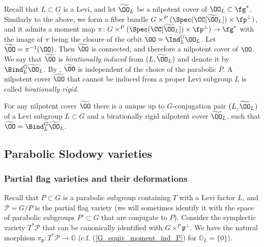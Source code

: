 \documentclass[12pt]{amsart}
\begin{document}
    Recall that $L\subset G$ is a Levi, and let $\widetilde{\OO}_L$ be a nilpotent cover of $\OO_L\subset \fg^*$. Similarly to the above, we form a fiber bundle $G\times^P(\Spec(\CC[\widetilde{\OO}_L])\times \fp^\perp)$, and it admits a moment map $\pi\colon G\times^P(\Spec(\CC[\widetilde{\OO}_L])\times \fp^\perp)\to \fg^*$ with the image of $\pi$ being the closure of the orbit $\OO=\Ind_L^G \OO_L$. Let $\widetilde{\OO}=\pi^{-1}(\OO)$. Then $\widetilde{\OO}$ is connected, and therefore a nilpotent cover of $\OO$. We say that $\widetilde{\OO}$ is \emph{birationally induced} from $(L, \widetilde{\OO}_L)$ and denote it by $\Bind_L^G \widetilde{\OO}_L$. By \cite[Proposition 2.4.1(i)]{LMBM}, $\widetilde{\OO}$ is independent of the choice of the parabolic $P$. A nilpotent cover $\widetilde{\OO}$ that cannot be induced from a proper Levi subgroup $L$ is called \emph{birationally rigid}. 
    \begin{prop}\label{bir ind to bir rigid}\cite[Proposition 2.4.1(iii)]{LMBM}
        For any nilpotent cover $\widetilde{\OO}$ there is a unique up to $G$-conjugation pair $(L,\widetilde{\OO}_L)$ of a Levi subgroup $L\subset G$ and a birationally rigid nilpotent cover $\widetilde{\OO}_L$, such that $\widetilde{\OO}=\Bind_L^G \widetilde{\OO}_L$.
    \end{prop}




    
     
     
    \subsection{Parabolic Slodowy varieties}\label{sec_parabolic_slodowy}
        \subsubsection{Partial flag varieties and their deformations}
    Recall that $P \subset G$ is a parabolic subgroup containing $T$ with a Levi factor $L$, and $\mathcal{P}=G/P$ is the partial flag variety (we will sometimes identify it with the space of parabolic subgroups $P' \subset G$ that are conjugate to $P$). Consider the symplectic variety $T^*\mathcal{P}$ that can be canonically identified with $G \times^P \mathfrak{p}^{\perp}$. We have the natural morphism  $\pi_{\mathfrak{p}}\colon T^*\mathcal{P} \rightarrow \overline{\mathbb{O}}$ (c.f. (\ref{G_equiv_moment_ind_P}) for $\mathbb{O}_{L}=\{0\}$).
\end{document}
